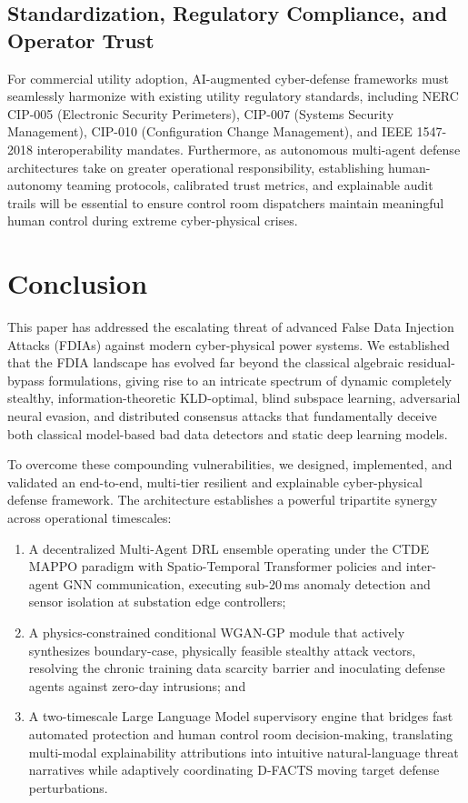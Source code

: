 \documentclass[journal,compsoc]{IEEEtran}
\begin{document}
\subsection{Standardization, Regulatory Compliance, and Operator Trust}
For commercial utility adoption, AI-augmented cyber-defense frameworks must seamlessly harmonize with existing utility regulatory standards, including NERC CIP-005 (Electronic Security Perimeters), CIP-007 (Systems Security Management), CIP-010 (Configuration Change Management), and IEEE 1547-2018 interoperability mandates. Furthermore, as autonomous multi-agent defense architectures take on greater operational responsibility, establishing human-autonomy teaming protocols, calibrated trust metrics, and explainable audit trails will be essential to ensure control room dispatchers maintain meaningful human control during extreme cyber-physical crises.


\section{Conclusion}
\label{sec:conclusion}

This paper has addressed the escalating threat of advanced False Data Injection Attacks (FDIAs) against modern cyber-physical power systems. We established that the FDIA landscape has evolved far beyond the classical algebraic residual-bypass formulations, giving rise to an intricate spectrum of dynamic completely stealthy, information-theoretic KLD-optimal, blind subspace learning, adversarial neural evasion, and distributed consensus attacks that fundamentally deceive both classical model-based bad data detectors and static deep learning models. 

To overcome these compounding vulnerabilities, we designed, implemented, and validated an end-to-end, multi-tier resilient and explainable cyber-physical defense framework. The architecture establishes a powerful tripartite synergy across operational timescales:
\begin{enumerate}
    \item A decentralized Multi-Agent DRL ensemble operating under the CTDE MAPPO paradigm with Spatio-Temporal Transformer policies and inter-agent GNN communication, executing sub-20\,ms anomaly detection and sensor isolation at substation edge controllers;
    \item A physics-constrained conditional WGAN-GP module that actively synthesizes boundary-case, physically feasible stealthy attack vectors, resolving the chronic training data scarcity barrier and inoculating defense agents against zero-day intrusions; and
    \item A two-timescale Large Language Model supervisory engine that bridges fast automated protection and human control room decision-making, translating multi-modal explainability attributions into intuitive natural-language threat narratives while adaptively coordinating D-FACTS moving target defense perturbations.
\end{enumerate}
\end{document}
